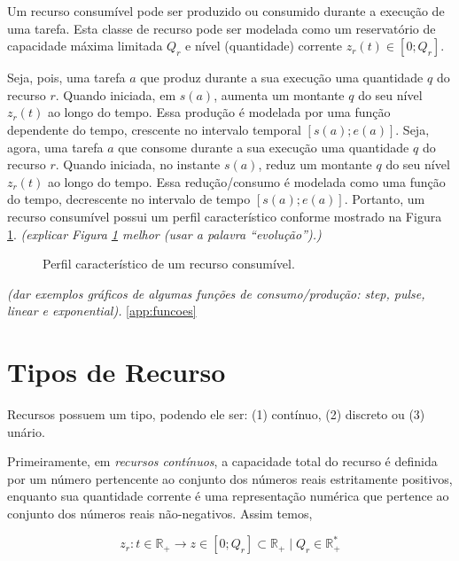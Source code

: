         Um recurso consumível pode ser produzido ou consumido durante a execução de uma tarefa. Esta classe de recurso pode ser modelada como um reservatório de capacidade máxima limitada $Q_r$ e nível (quantidade) corrente $z_r(t) \in [0; Q_r]$.
        
        Seja, pois, uma tarefa $a$ que produz durante a sua execução uma quantidade $q$ do recurso $r$. Quando iniciada, em $s(a)$, aumenta um montante $q$ do seu nível $z_r(t)$ ao longo do tempo. Essa produção é modelada por uma função dependente do tempo, crescente no intervalo temporal $[s(a); e(a)]$. Seja, agora, uma tarefa $a$ que consome durante a sua execução uma quantidade $q$ do recurso $r$. Quando iniciada, no instante $s(a)$, reduz um montante $q$ do seu nível $z_r(t)$ ao longo do tempo. Essa redução/consumo é modelada como uma função do tempo, decrescente no intervalo de tempo $[s(a); e(a)]$. Portanto, um recurso consumível possui um perfil característico conforme mostrado na Figura \ref{fig:recurso_consumivel}. \emph{\color{red} (explicar Figura \ref{fig:recurso_consumivel} melhor (usar a palavra ``evolução'').)}
        
        \begin{figure}
            \centering
            
            \caption{Perfil característico de um recurso consumível.} \label{fig:recurso_consumivel}
        \end{figure}
        
        \emph{\color{red} (dar exemplos gráficos de algumas funções de consumo/produção: \textit{step}, \textit{pulse}, \textit{linear} e \textit{exponential}). } \ref{app:funcoes}
        
    
    \section{Tipos de Recurso} \label{sec:tipos_recurso}
    
        Recursos possuem um tipo, podendo ele ser: (1) contínuo, (2) discreto ou (3) unário. 
        
        Primeiramente, em \textit{recursos contínuos}, a capacidade total do recurso é definida por um número pertencente ao conjunto dos números reais estritamente positivos, enquanto sua quantidade corrente é uma representação numérica que pertence ao conjunto dos números reais não-negativos. Assim temos, 
        
        \begin{equation} \label{eq:recurso_continuo}
            z_r: t \in \mathbb{R}_+ \to z \in [0; Q_r] \subset \mathbb{R}_+ \mid Q_r \in \mathbb{R}_+^*
        \end{equation}
        
